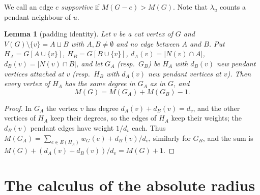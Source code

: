 \documentclass[11pt]{amsart}
\newtheorem{lemma}[theorem]{Lemma}
\theoremstyle{definition}
\begin{document}
We call an edge $e$ \emph{supportive} if $M(G-e)>M(G)$. Note that $\lambda_u$ counts a pendant neighbour of $u$.

\begin{lemma}[padding identity]\label{lem:padM}
Let $v$ be a cut vertex of $G$ and $V(G)\setminus\{v\}=A\sqcup B$ with $A,B\neq\emptyset$ and no edge
between $A$ and $B$. Put $H_A=G[A\cup\{v\}]$, $H_B=G[B\cup\{v\}]$, $d_A(v)=|N(v)\cap A|$, $d_B(v)=|N(v)\cap B|$,
and let $G_A$ (resp.\ $G_B$) be $H_A$ with $d_B(v)$ new pendant vertices attached at $v$ (resp.\ $H_B$ with
$d_A(v)$ new pendant vertices at $v$). Then every vertex of $H_A$ has the same degree in $G_A$ as in $G$, and
\[ M(G)=M(G_A)+M(G_B)-1 . \]
\end{lemma}
\begin{proof}
In $G_A$ the vertex $v$ has degree $d_A(v)+d_B(v)=d_v$, and the other vertices of $H_A$ keep their degrees, so
the edges of $H_A$ keep their weights; the $d_B(v)$ pendant edges have weight $1/d_v$ each. Thus
$M(G_A)=\sum_{e\in E(H_A)}w_G(e)+d_B(v)/d_v$, similarly for $G_B$, and the sum is
$M(G)+(d_A(v)+d_B(v))/d_v=M(G)+1$.
\end{proof}

\section{The calculus of the absolute radius}\label{sec:rhocalc}
\end{document}
